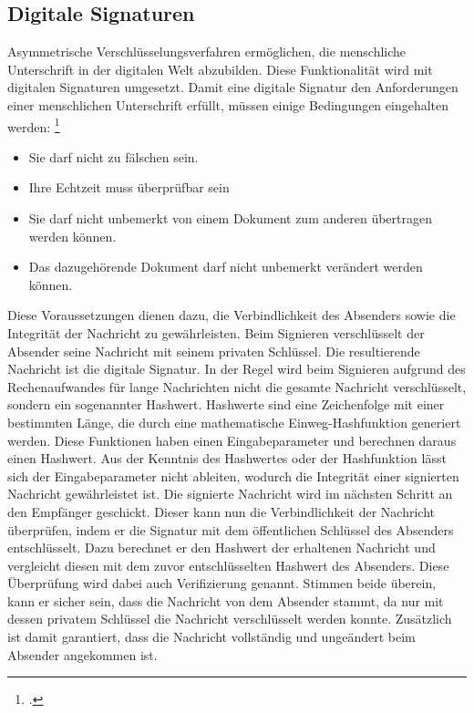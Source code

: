 \documentclass  [paper=a4,
				fontsize=12pt,
				listof=totoc,
				bibliography=totoc
				]{scrreprt}
\begin{document}
			\subsection{Digitale Signaturen}\label{chp: Signatur}	
				Asymmetrische Verschlüsselungsverfahren ermöglichen, die menschliche Unterschrift in der digitalen Welt abzubilden. Diese Funktionalität wird mit digitalen Signaturen umgesetzt. Damit eine digitale Signatur den Anforderungen einer menschlichen Unterschrift erfüllt, müssen einige Bedingungen eingehalten werden:
				\footcite[S. 202]{Schmeh2013}
				\begin{itemize}
					\item Sie darf nicht zu fälschen sein.
					\item Ihre Echtzeit muss überprüfbar sein
					\item Sie darf nicht unbemerkt von einem Dokument zum anderen übertragen werden können.
					\item Das dazugehörende Dokument darf nicht unbemerkt verändert werden können.
				\end{itemize}
				Diese Voraussetzungen dienen dazu, die Verbindlichkeit des Absenders sowie die Integrität der Nachricht zu gewährleisten. Beim Signieren verschlüsselt der Absender seine Nachricht mit seinem privaten Schlüssel. Die resultierende Nachricht ist die digitale Signatur. In der Regel wird
				beim Signieren aufgrund des Rechenaufwandes für lange Nachrichten nicht die gesamte Nachricht verschlüsselt, sondern ein sogenannter Hashwert. Hashwerte sind eine Zeichenfolge mit einer bestimmten Länge, die durch eine mathematische Einweg-Hashfunktion generiert werden. Diese Funktionen haben einen Eingabeparameter und berechnen daraus einen Hashwert. Aus der Kenntnis des Hashwertes oder der Hashfunktion lässt sich der Eingabeparameter nicht ableiten, wodurch die Integrität einer signierten Nachricht gewährleistet ist.
				Die signierte Nachricht wird im nächsten Schritt an den Empfänger geschickt. Dieser kann nun die Verbindlichkeit der Nachricht überprüfen, indem er die Signatur mit dem öffentlichen Schlüssel des Absenders entschlüsselt. Dazu berechnet er den Hashwert der erhaltenen Nachricht und vergleicht diesen mit dem zuvor entschlüsselten Hashwert des Absenders. Diese Überprüfung wird dabei auch Verifizierung genannt. Stimmen beide überein, kann er sicher sein, dass die Nachricht von dem Absender stammt, da nur mit dessen privatem Schlüssel die Nachricht verschlüsselt werden konnte. Zusätzlich ist damit garantiert, dass die Nachricht vollständig und ungeändert beim Absender angekommen ist.
				
\end{document}
